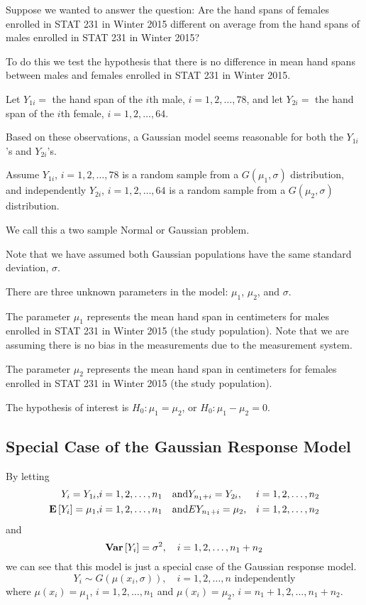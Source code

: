 \begin{exbox}
    \begin{example}
        Suppose we wanted to answer the question: Are the hand spans of females enrolled
        in STAT 231 in Winter 2015 different on average from the hand spans of males enrolled
        in STAT 231 in Winter 2015?

        To do this we test the hypothesis that there is no difference in mean hand spans
        between males and females enrolled in STAT 231 in Winter 2015.

        Let $ Y_{1i}= $ the hand span of the $ i $th male, $ i=1,2,\ldots ,78 $,
        and let $ Y_{2i}= $ the hand span of the $ i $th female, $ i=1,2,\ldots ,64 $.

        Based on these observations, a Gaussian model seems reasonable for both the $ Y_{1i} $'s
        and $ Y_{2i} $'s.

        Assume $ Y_{1i} $, $ i=1,2,\ldots ,78 $ is a random sample from a $ G(\mu_1,\sigma) $
        distribution, and independently $ Y_{2i} $, $ i=1,2,\ldots ,64 $ is a random
        sample from a $ G(\mu_2,\sigma) $ distribution.

        We call this a two sample Normal or Gaussian problem.

        Note that we have assumed both Gaussian populations have the same standard deviation,
        $ \sigma $.

        There are three unknown parameters in the model: $ \mu_1 $, $ \mu_2 $, and $ \sigma $.

        The parameter $ \mu_1 $ represents the mean hand span in centimeters for males
        enrolled in STAT 231 in Winter 2015 (the study population). Note that we are assuming
        there is no bias in the measurements due to the measurement system.

        The parameter $ \mu_2 $ represents the mean hand span in centimeters for females
        enrolled in STAT 231 in Winter 2015 (the study population).

        The hypothesis of interest is $ H_0:\mu_1=\mu_2 $, or $ H_0:\mu_1-\mu_2=0 $.
    \end{example}
\end{exbox}

\subsection{Special Case of the Gaussian Response Model}
By letting
\[\begin{aligned}
        Y_{i}=Y_{1 i},     & i=1,2, \ldots, n_{1} & \text{and} & Y_{n_{1}+i}=Y_{2 i},    & i=1,2, \ldots, n_{2} \\
        \bm{\mathrm{E}}\left[Y_{i}\right]=\mu_{1}, & i=1,2, \ldots, n_{1} & \text{and} & E{Y_{n_{1}+i}}=\mu_{2}, & i=1,2, \ldots, n_{2}
    \end{aligned}\]
and
\[\bm{\mathrm{Var}}\left[Y_{i}\right]=\sigma^{2}, \quad i=1,2, \ldots, n_{1}+n_{2}\]
we can see that this model is just a special case of the Gaussian response model.
\[ Y_i\sim G\left( \mu(x_i,\sigma) \right),\quad i=1,2,\ldots ,n\text{ independently} \]
where $ \mu(x_i)=\mu_1 $, $ i=1,2,\ldots ,n_1 $ and $ \mu(x_i)=\mu_2 $, $ i=n_1+1,2,\ldots ,n_1+n_2 $.

